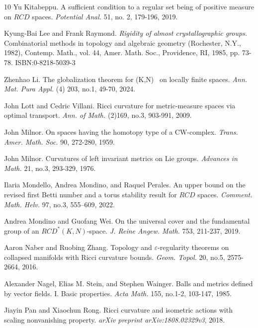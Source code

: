 \documentclass[12pt]{amsart}
\theoremstyle{definition}
\numberwithin{equation}{section}
\newcommand{\cdkn}{\text{CD}(K,N)}
\begin{document}
\begin{thebibliography}{10}
Yu Kitabeppu. 
\newblock A sufficient condition to a regular set being of positive measure on $RCD$ spaces. {\em Potential Anal. }51, no. 2, 179-196, 2019.



 Kyung-Bai Lee and  Frank Raymond. 
 {\em Rigidity of almost crystallographic groups.} Combinatorial methods in topology and algebraic geometry (Rochester, N.Y., 1982), Contemp. Math., vol. 44, Amer. Math. Soc., Providence, RI, 1985, pp. 73-78.
ISBN:0-8218-5039-3


Zhenhao Li. \newblock The globalization theorem for \cdkn~ on locally finite spaces. {\em Ann. Mat. Pura Appl. }(4) 203, no.1, 49-70, 2024.


John Lott and Cedric Villani.  
\newblock Ricci curvature for metric-measure spaces via optimal transport. {\em Ann. of Math. } (2)169, no.3, 903-991, 2009.


John Milnor.  
\newblock On spaces having the homotopy type of a CW-complex. {\em Trans. Amer. Math. Soc. }90, 272-280, 1959.

John Milnor.
\newblock Curvatures of left invariant metrics on Lie groups. {\em Advances in Math. }21, no.3, 293-329, 1976.



Ilaria Mondello, Andrea Mondino, and Raquel Perales. 
\newblock An upper bound on the revised first Betti number and a torus stability result for $RCD$ spaces. {\em Comment. Math. Helv. }97, no.3, 555--609, 2022.


Andrea  Mondino and  Guofang Wei.   
 \newblock On the universal cover and the fundamental group of an $RCD^{\ast}(K,N)$-space. {\em J. Reine Angew. Math. } 753, 211-237, 2019.

Aaron Naber and Ruobing Zhang.  
\newblock Topology and $\varepsilon$-regularity theorems on collapsed manifolds with Ricci curvature bounds. {\em  
Geom. Topol. } 20, no.5, 2575-2664, 2016.


Alexander Nagel, Elias M. Stein, and Stephen Wainger.
\newblock Balls and metrics defined by vector fields. I. Basic properties. {\em  Acta Math. }155, no.1-2, 103-147, 1985.



Jiayin Pan and Xiaochun Rong. 
\newblock Ricci curvature and isometric actions with scaling nonvanishing property. {\em arXiv preprint  arXiv:1808.02329v3}, 2018.




\end{thebibliography}
\end{document}
